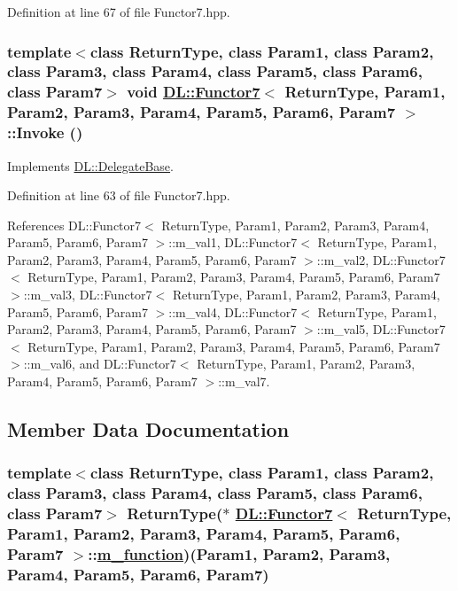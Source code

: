 Definition at line 67 of file Functor7.hpp.\hypertarget{classDL_1_1Functor7_a2}{
\subsubsection[Invoke]{\setlength{\rightskip}{0pt plus 5cm}template$<$class Return\-Type, class Param1, class Param2, class Param3, class Param4, class Param5, class Param6, class Param7$>$ void \hyperlink{classDL_1_1Functor7}{DL::Functor7}$<$ Return\-Type, Param1, Param2, Param3, Param4, Param5, Param6, Param7 $>$::Invoke ()}}
\label{classDL_1_1Functor7_a2}




Implements \hyperlink{classDL_1_1DelegateBase_a2}{DL::Delegate\-Base}.

Definition at line 63 of file Functor7.hpp.

References DL::Functor7$<$ Return\-Type, Param1, Param2, Param3, Param4, Param5, Param6, Param7 $>$::m\_\-val1, DL::Functor7$<$ Return\-Type, Param1, Param2, Param3, Param4, Param5, Param6, Param7 $>$::m\_\-val2, DL::Functor7$<$ Return\-Type, Param1, Param2, Param3, Param4, Param5, Param6, Param7 $>$::m\_\-val3, DL::Functor7$<$ Return\-Type, Param1, Param2, Param3, Param4, Param5, Param6, Param7 $>$::m\_\-val4, DL::Functor7$<$ Return\-Type, Param1, Param2, Param3, Param4, Param5, Param6, Param7 $>$::m\_\-val5, DL::Functor7$<$ Return\-Type, Param1, Param2, Param3, Param4, Param5, Param6, Param7 $>$::m\_\-val6, and DL::Functor7$<$ Return\-Type, Param1, Param2, Param3, Param4, Param5, Param6, Param7 $>$::m\_\-val7.

\subsection{Member Data Documentation}
\hypertarget{classDL_1_1Functor7_r0}{
\subsubsection[m\_\-function]{\setlength{\rightskip}{0pt plus 5cm}template$<$class Return\-Type, class Param1, class Param2, class Param3, class Param4, class Param5, class Param6, class Param7$>$ Return\-Type($\ast$ \hyperlink{classDL_1_1Functor7}{DL::Functor7}$<$ Return\-Type, Param1, Param2, Param3, Param4, Param5, Param6, Param7 $>$::\hyperlink{classDL_1_1Functor7_r0}{m\_\-function})(Param1, Param2, Param3, Param4, Param5, Param6, Param7)}}
\label{classDL_1_1Functor7_r0}




